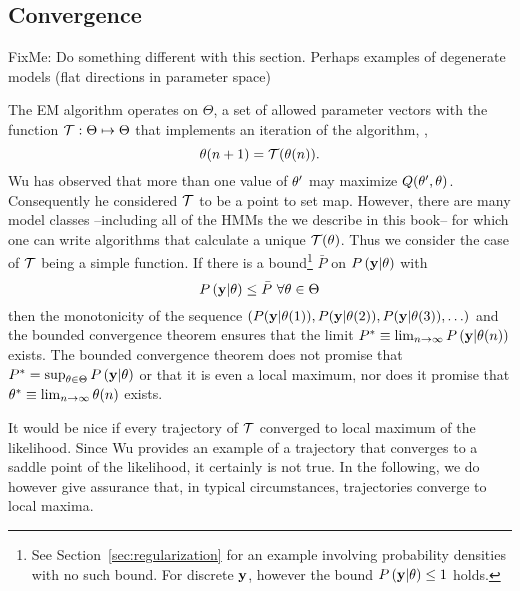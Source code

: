\subsection{Convergence}

FixMe: Do something different with this section.  Perhaps examples of
degenerate models (flat directions in parameter space)

\newcommand{\EMmap}{{\cal T}} %
The EM algorithm operates on $\Theta$, a set of allowed parameter
vectors with the function $\EMmap:\Theta \mapsto \Theta$ that
implements an iteration of the algorithm, \ie,
\begin{equation*}
  \ti{\parameters}{n+1} = \EMmap (\ti{\parameters}{n}).
\end{equation*}
Wu\cite{Wu83} has observed that more than one value of $\theta'$
may maximize $Q(\theta',\theta)$.  Consequently he
considered $\EMmap$ to be a point to set map.  However, there are many
model classes --including all of the HMMs the we describe in this
book-- for which one can write algorithms that calculate a unique
$\EMmap(\theta)$.  Thus we consider the case of $\EMmap$ being a
simple function.  If there is a bound\footnote{See
  Section~\ref{sec:regularization} for an example involving
  probability densities with no such bound.  For discrete $\mathbf{y}$,
  however the bound $ P \left(\mathbf{y}|\theta \right) \leq 1$ holds.}
$\bar P$ on $ P \left(\mathbf{y}|\theta \right) $ with
\begin{equation*}
   P \left(\mathbf{y}|\theta \right) \leq \bar P ~ \forall \theta \in \Theta
\end{equation*}
then the monotonicity of the sequence $\left(
  P(\mathbf{y}|{\theta}{(1)}),
  P(\mathbf{y}|{\theta}{(2)}), P(\mathbf{y}|{\theta}{(3)}), \ldots \right)$ and the bounded
convergence theorem ensures that the limit $ P^* \equiv
\lim_{n\rightarrow \infty} P \left(\mathbf{y} |{\theta}{(n)} \right) $
exists.  The bounded convergence theorem does not promise that $P^* =
\sup_{\theta \in \Theta} P \left(\mathbf{y} | \theta \right)$ or
that it is even a local maximum, nor does it promise that $\theta^*
\equiv \lim_{n \rightarrow \infty} {\theta}{(n)}$ exists.

It would be nice if every trajectory of $\EMmap$ converged to local
maximum of the likelihood.  Since Wu\cite{Wu83} provides an example of
a trajectory that converges to a saddle point of the likelihood, it
certainly is not true.  In the following, we do however give assurance
that, in typical circumstances, trajectories converge to local maxima.

